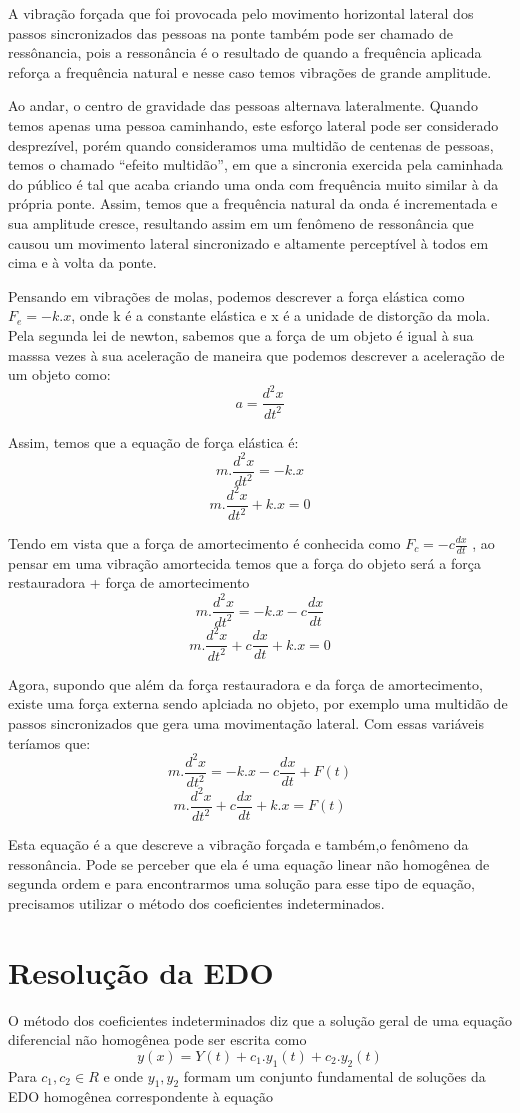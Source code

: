 \documentclass[]{article}
\begin{document}
A vibração forçada que foi provocada pelo movimento horizontal lateral dos passos sincronizados das pessoas na ponte também pode ser 
chamado de ressônancia, pois a ressonância  é o resultado de quando a frequência aplicada reforça a frequência natural e nesse caso temos vibrações de grande amplitude.

Ao andar, o centro de gravidade das pessoas alternava lateralmente. 
Quando temos apenas uma pessoa caminhando, este esforço lateral pode ser considerado 
desprezível, porém quando consideramos uma multidão de centenas de pessoas, temos o 
chamado “efeito multidão”, em que a sincronia exercida pela caminhada do público é tal 
que acaba criando uma onda com frequência muito similar à da própria ponte. Assim, 
temos que a frequência natural da onda é incrementada e sua amplitude cresce, 
resultando assim em um fenômeno de ressonância que causou um movimento lateral 
sincronizado e altamente perceptível à todos em cima e à volta da ponte.

Pensando em vibrações de molas, podemos descrever a força elástica como $F_e = -k.x$, onde k é a
constante elástica e x é a unidade de distorção da mola. Pela segunda lei de newton, sabemos que a força de um
objeto é igual à sua masssa vezes à sua aceleração de maneira que podemos descrever a aceleração de um objeto como:
\[ a = \frac{d^2 x}{d t^2} \]

Assim, temos que a equação de força elástica é:
\[ m.\frac{d^2 x}{d t^2} = -k.x \]
\[ m.\frac{d^2 x}{d t^2} + k.x = 0\]

Tendo em vista que a força de amortecimento é conhecida como $F_c = -c\frac{dx}{dt}$ ,
ao pensar em uma vibração amortecida temos que a força do objeto será a 
força restauradora + força de amortecimento
\[ m.\frac{d^2 x}{d t^2} = -k.x - c\frac{dx}{dt}\]
\[ m.\frac{d^2 x}{d t^2} + c\frac{dx}{dt}  + k.x = 0\]

Agora, supondo que além da força restauradora e da força de amortecimento, existe uma força externa sendo aplciada no
objeto, por exemplo uma multidão de passos sincronizados que gera uma movimentação lateral.
Com essas variáveis teríamos que:
\[ m.\frac{d^2 x}{d t^2} = -k.x - c\frac{dx}{dt} + F(t)\] 
\[ m.\frac{d^2 x}{d t^2} + c\frac{dx}{dt}  + k.x = F(t)\] 

Esta equação é a que descreve a vibração forçada e também,o fenômeno da ressonância.
Pode se perceber que ela é uma equação linear não homogênea de segunda ordem e para encontrarmos 
uma solução para esse tipo de equação, precisamos utilizar o método dos coeficientes indeterminados.

\pagebreak 
\section{Resolução da EDO}
O método dos coeficientes indeterminados diz que a solução geral de uma equação diferencial não homogênea
pode ser escrita como
\[ y(x) = Y(t) + c_1.y_1(t) + c_2.y_2(t)\] 
Para $c_1, c_2 \in R$ e onde ${y_1,y_2}$ formam um conjunto fundamental de soluções
da EDO homogênea correspondente à equação 
\end{document}
